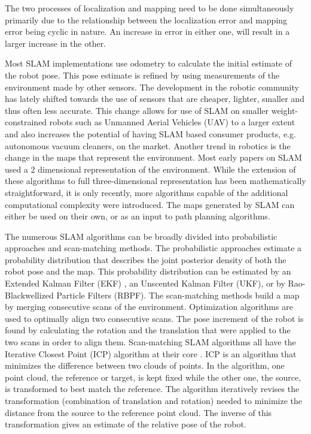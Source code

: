 	The two processes of localization and mapping need to be done simultaneously primarily due to the relationship between the localization error and mapping error being cyclic in nature. An increase in error in either one, will result in a larger increase in the other. 
	
	 Most SLAM implementations use odometry to calculate the initial estimate of the robot pose. This pose estimate is refined by using measurements of the environment made by other sensors. The development in the robotic community has lately shifted towards the	use of sensors that are cheaper, lighter, smaller and thus often less accurate. This change allows for use of SLAM on smaller weight-constrained robots such as Unmanned Aerial Vehicles (UAV) to a larger extent\cite{steder2008} and also increases the potential of having SLAM based consumer products, e.g.\, autonomous vacuum cleaners, on the market. Another trend in robotics is the change in the maps that represent the environment. Most early papers on SLAM used a 2 dimensional representation of the environment. While the extension of these algorithms to full three-dimensional representation has been mathematically straightforward, it is only recently, more algorithms capable of the additional computational complexity were introduced\cite{3d1,3d2,3d3}. The maps generated by SLAM can either be used on their own\cite{mineMapping,Arbeiter2010}, or as an input to path planning algorithms\cite{pp1,pp2,pp3,pp4,pp5,pp6}.  
	
	The numerous SLAM algorithms can be broadly divided into probabilistic approaches and scan-matching methods. The probabilistic approaches estimate a probability distribution that describes the joint posterior density of both the robot pose and the map. This probability distribution can be estimated by an Extended Kalman Filter (EKF) \cite{ekfSLAM1,ekfSLAM2,ekfSLAM3,ekfSLAM4}, an Unscented Kalman Filter (UKF)\cite{ukf1,ukf2,ukf3,ukf4}, or by Rao-Blackwellized Particle Filters (RBPF)\cite{particleSLAM1,particleSLAM2,particleSLAM3,particleSLAM4,particleSLAM5}. The scan-matching methods build a map by merging consecutive scans of the environment. Optimization algorithms are used to optimally align two consecutive scans. The pose increment of the robot is found by calculating the rotation and the translation that were applied to the two scans in order to align them. Scan-matching SLAM algorithms all have the Iterative Closest Point (ICP) algorithm at their core \cite{icp1}. ICP is an algorithm that minimizes the difference between two clouds of points. In the algorithm, one point cloud, the reference or target, is kept fixed while the other one, the source, is transformed to best match the reference. The algorithm iteratively revises the transformation (combination of translation and rotation) needed to minimize the distance from the source to the reference point cloud. The inverse of this transformation gives an estimate of the relative pose of the robot. 
		
